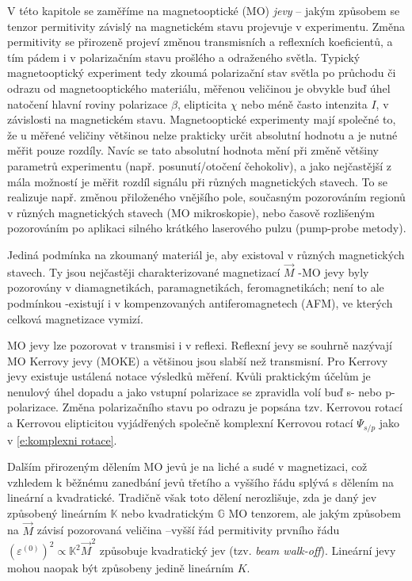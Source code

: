 V této kapitole se zaměříme na magnetooptické (MO) \emph{jevy} -- jakým způsobem se tenzor permitivity závislý na magnetickém stavu projevuje v experimentu.
Změna permitivity se přirozeně projeví změnou transmisních a reflexních koeficientů, a tím pádem i v polarizačním stavu prošlého a odraženého světla.
Typický magnetooptický experiment tedy zkoumá polarizační stav světla po průchodu či odrazu od magnetooptického materiálu, měřenou veličinou je obvykle buď úhel natočení hlavní roviny polarizace $\beta$, elipticita $\chi$ nebo méně často intenzita $I$, v závislosti na magnetickém stavu.
Magnetooptické experimenty mají společné to, že u měřené veličiny většinou nelze prakticky určit absolutní hodnotu a je nutné měřit pouze rozdíly\cite{silberQuadraticMagnetoopticKerr2019a}.
Navíc se tato absolutní hodnota mění při změně většiny parametrů experimentu (např. posunutí/otočení čehokoliv), a jako nejčastější z mála možností je měřit rozdíl signálu při různých magnetických stavech.
To se realizuje např. změnou přiloženého vnějšího pole, současným pozorováním regionů v různých magnetických stavech (MO mikroskopie), nebo časově rozlišeným pozorováním po aplikaci silného krátkého laserového pulzu (pump-probe metody).

Jediná podmínka na zkoumaný materiál je, aby existoval v různých magnetických stavech.
Ty jsou nejčastěji charakterizované magnetizací $\vec{M}$ -\tododash MO jevy byly pozorovány v diamagnetikách, paramagnetikách, feromagnetikách;
není to ale podmínkou -\tododash existují i v kompenzovaných antiferomagnetech (AFM), ve kterých celková magnetizace vymizí.

MO jevy lze pozorovat v transmisi i v reflexi.
Reflexní jevy se souhrně nazývají MO Kerrovy jevy (MOKE) a většinou jsou slabší než transmisní.
Pro Kerrovy jevy existuje ustálená notace výsledků měření.
Kvůli praktickým účelům je nenulový úhel dopadu a jako vstupní polarizace se zpravidla volí buď s- nebo p-polarizace. Změna polarizačního stavu po odrazu je popsána tzv. Kerrovou rotací a Kerrovou elipticitou vyjádřených společně komplexní Kerrovou rotací $\Psi_{s/p}$ jako v \eqref{e:komplexni rotace}.

Dalším přirozeným dělením MO jevů je na liché a sudé v magnetizaci, což vzhledem k běžnému zanedbání jevů třetího a vyššího řádu splývá s dělením na lineární a kvadratické.
Tradičně však toto dělení nerozlišuje, zda je daný jev způsobený lineárním  $\mathbb{K}$ nebo kvadratickým $\mathbb{G}$ MO tenzorem, ale jakým způsobem na $\vec{M}$ závisí pozorovaná veličina --\tododash vyšší řád permitivity prvního řádu $\left(\varepsilon^{(0)}\right)^2 \propto \mathbb{K}^2 \vec{M}^2$ způsobuje kvadratický jev (tzv. \emph{beam walk-off}).
Lineární jevy mohou naopak být způsobeny jedině lineárním $K$.


